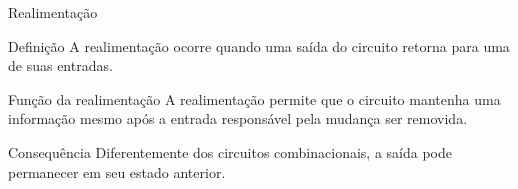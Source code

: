 
\begin{frame}{Realimentação}

    \begin{block}{Definição}
        A realimentação ocorre quando uma saída do circuito retorna
        para uma de suas entradas.
    \end{block}

    \begin{alertblock}{Função da realimentação}
        A realimentação permite que o circuito mantenha uma informação
        mesmo após a entrada responsável pela mudança ser removida.
    \end{alertblock}

    \begin{block}{Consequência}
        Diferentemente dos circuitos combinacionais, a saída pode
        permanecer em seu estado anterior.
    \end{block}

\end{frame}